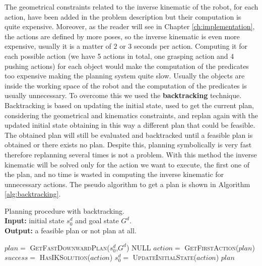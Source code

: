 The geometrical constraints related to the inverse kinematic of the robot, for each action, have been added in the problem description but their computation is quite expensive. Moreover, as the reader will see in Chapter \ref{ch:implementation}, the actions are defined by more poses, so the inverse kinematic is even more expensive, usually it is a matter of $2$ or $3$ seconds per action. Computing it for each possible action (we have 5 actions in total, one grasping action and 4 pushing actions) for each object would make the computation of the predicates too expensive making the planning system quite slow. Usually the objects are inside the working space of the robot and the computation of the  predicates is usually unnecessary. To overcome this we used the \textbf{backtracking} technique\citep{Bidot2015}. Backtracking is based on updating the initial state, used to get the current plan, considering the geometrical and kinematics constraints, and replan again with the updated initial state obtaining in this way a different plan that could be feasible. The obtained plan will still be evaluated and backtracked until a feasible plan is obtained or there exists no plan. Despite this, planning symbolically is very fast therefore replanning several times is not a problem. With this method the inverse kinematic will be solved only for the action we want to execute, the first one of the plan, and no time is wasted in computing the inverse kinematic for unnecessary actions. The pseudo algorithm to get a plan is shown in Algorithm \ref{alg:backtracking}.

\begin{algorithm}
\caption{Planning procedure with backtracking.\\
\textbf{Input:} initial state $s_{0}^d$ and goal state $G^d$. \\
\textbf{Output:} a feasible plan or not plan at all. }\label{alg:backtracking}
\begin{algorithmic}
\Repeat
  \State $plan =$ \textsc{GetFastDownwardPlan}($s_{0}^d$,$G^d$)
  		\Return NULL 
  \EndIf
  \State $action=$ \textsc{GetFirstAction}($plan$)
  \State $success =$ \textsc{HasIKSolution}($action$) 
    \State $s_{0}^d =$ \textsc{UpdateInitialState}($action$) 
  \EndIf
{}
\Return $plan$
\EndProcedure
\end{algorithmic}
\end{algorithm}  

